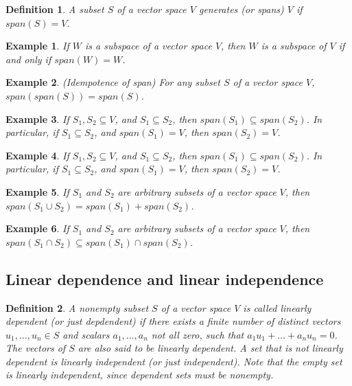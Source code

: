 \documentclass[a4paper]{article}
\newtheorem{example}{Example}
\newtheorem{mydef}{Definition}
\numberwithin{mytheorem}{section}
\numberwithin{mydef}{section}
\numberwithin{example}{section}
\begin{document}
\begin{mydef} A subset $S$ of a vector space $V$ generates (or spans) $V$ if $span(S) = V$. 
\end{mydef}

\begin{example} If $W$ is a subspace of a vector space $V$, then $W$ is a subspace of $V$ if and only if $span(W) = W$.
\end{example}

\begin{example} (Idempotence of span) For any subset $S$ of a vector space $V$, $span(span(S)) = span(S)$.
\end{example}

\begin{example} If $S_{1},S_{2} \subseteq V$, and $S_{1} \subseteq S_{2}$, then $span(S_{1}) \subseteq span(S_{2})$. In particular, if $S_{1} \subseteq S_{2}$, and $span(S_{1}) = V$, then $span(S_{2}) = V$.
\end{example}

\begin{example} If $S_{1},S_{2} \subseteq V$, and $S_{1} \subseteq S_{2}$, then $span(S_{1}) \subseteq span(S_{2})$. In particular, if $S_{1} \subseteq S_{2}$, and $span(S_{1}) = V$, then $span(S_{2}) = V$.
\end{example}

\begin{example} If $S_{1}$ and $S_{2}$ are arbitrary subsets of a vector space $V$, then $span(S_{1} \cup S_{2}) = span(S_{1}) + span(S_{2})$.
\end{example}

\begin{example} If $S_{1}$ and $S_{2}$ are arbitrary subsets of a vector space $V$, then $span(S_{1} \cap S_{2}) \subseteq span(S_{1}) \cap span(S_{2})$.
\end{example}

\subsection{Linear dependence and linear independence}

\begin{mydef} A nonempty subset $S$ of a vector space $V$ is called linearly dependent (or just depdendent) if there exists a finite number of distinct vectors $u_{1},...,u_{n} \in S$ and scalars $a_{1},...,a_{n}$ not all zero, such that $a_{1}u_{1} + ... + a_{n}u_{n} = 0$. The vectors of $S$ are also said to be linearly dependent. A set that is not linearly dependent is linearly independent (or just independent). Note that the empty set is linearly independent, since dependent sets must be nonempty.
\end{mydef}
\end{document}
